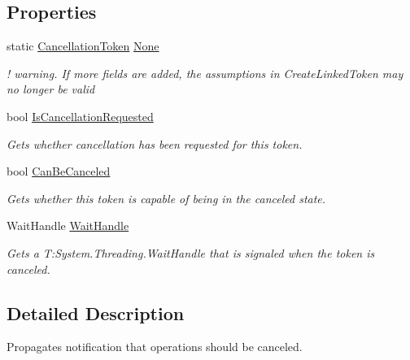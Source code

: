 \subsection*{Properties}
\begin{DoxyCompactItemize}
\item 
static \hyperlink{struct_system_1_1_threading_1_1_cancellation_token}{Cancellation\+Token} \hyperlink{struct_system_1_1_threading_1_1_cancellation_token_aa93a5902f076f45412f5e8fbfece237a}{None}
\begin{DoxyCompactList}\small\item\em ! warning. If more fields are added, the assumptions in Create\+Linked\+Token may no longer be valid \end{DoxyCompactList}\item 
bool \hyperlink{struct_system_1_1_threading_1_1_cancellation_token_a1b0338d63f9b268339e7348629301748}{Is\+Cancellation\+Requested}
\begin{DoxyCompactList}\small\item\em Gets whether cancellation has been requested for this token. \end{DoxyCompactList}\item 
bool \hyperlink{struct_system_1_1_threading_1_1_cancellation_token_ae9726dbc54733ce5d174707fc596b8e9}{Can\+Be\+Canceled}
\begin{DoxyCompactList}\small\item\em Gets whether this token is capable of being in the canceled state. \end{DoxyCompactList}\item 
Wait\+Handle \hyperlink{struct_system_1_1_threading_1_1_cancellation_token_afa0dab8fb50808aa34e813683d47611b}{Wait\+Handle}
\begin{DoxyCompactList}\small\item\em Gets a T\+:\+System.\+Threading.\+Wait\+Handle that is signaled when the token is canceled.\end{DoxyCompactList}\end{DoxyCompactItemize}


\subsection{Detailed Description}
Propagates notification that operations should be canceled. 

